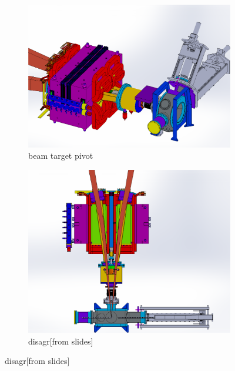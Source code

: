 \begin{figure}
     \centering
     \begin{subfigure}[b]{0.45\textwidth}
         \centering
         \includegraphics[width=\textwidth]{images/chap3/beam_line_target_pivot.png}
         \caption{beam target pivot}
         \label{Photo of CEBAF}
     \end{subfigure}
     \hfill
     \begin{subfigure}[b]{0.45\textwidth}
         \centering
         \includegraphics[width=\textwidth]{images/chap3/hrs_colli_corss_diag.png}
         \caption{disagr[from slides]}
         \label{gem_structure}
     \end{subfigure}
\end{figure}

